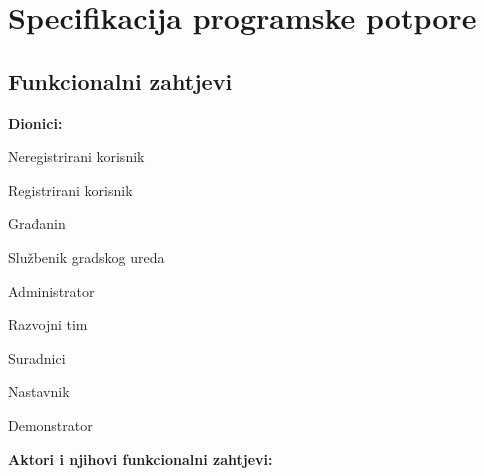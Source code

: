 \chapter{Specifikacija programske potpore}

\section{Funkcionalni zahtjevi}

\noindent \textbf{Dionici:}

\begin{packed_enum}

	\item Neregistrirani korisnik
	\item Registrirani korisnik
	\begin{packed_enum}
		\item Građanin
		\item Službenik gradskog ureda
	\end{packed_enum}
	\item Administrator
	\item Razvojni tim
	\item Suradnici
	\begin{packed_enum}
		\item Nastavnik
		\item Demonstrator
	\end{packed_enum}

\end{packed_enum}

\noindent \textbf{Aktori i njihovi funkcionalni zahtjevi:}


